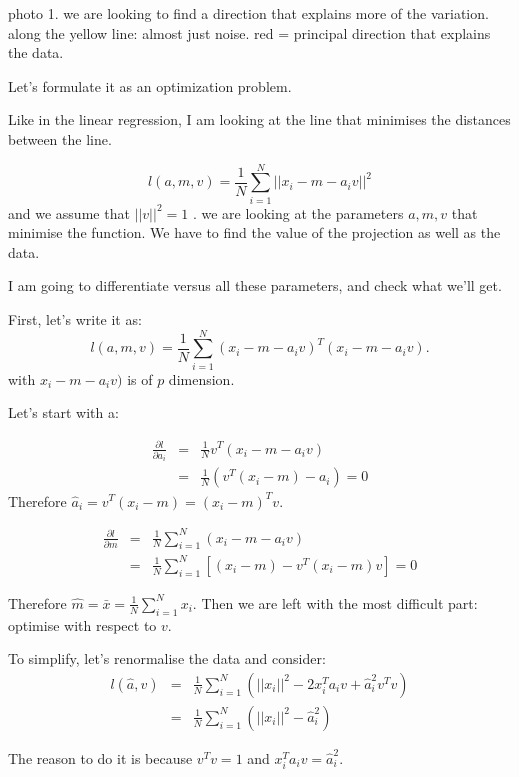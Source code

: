 \documentclass[a4paper]{tufte-book}
\newcommand{\nth}{\frac{1}{N}}
\newcommand{\sumin}{\sum_{i=1}^N}
\begin{document}
photo 1.
we are looking to find a direction that explains more of the variation.
along the yellow line: almost just noise.
red = principal direction that explains the data.

Let's formulate it as an optimization problem.

Like in the linear regression, I am looking at the line that minimises the
distances between the line.

\begin{equation}
    l(a,m,v) = \nth \sumin ||x_i - m - a_i v ||^2
\end{equation}
and we assume that $||v||^2 = 1$ .
we are looking at the parameters $a,m,v$ that minimise the function.
We have to find the value of the projection as well as the data.

I am going to differentiate versus all these parameters, and check what we'll
get.

First, let's write it as:
\begin{equation}
    l(a,m,v) = \nth \sumin (x_i - m - a_iv)^T(x_i - m - a_iv).
\end{equation}
with $x_i - m - a_i v)$ is of $p$ dimension.

Let's start with a:

\begin{eqnarray}
    \frac{\partial l}{\partial a_i} & = & \nth v^T (x_i - m - a_i v)\\
     & = & \nth (v^T (x_i - m) - a_i) = 0
 \end{eqnarray}
 Therefore $\hat a_i = v^T (x_i - m) = (x_i - m)^T v$.

\begin{eqnarray}
     \frac{\partial l}{\partial m} & = & \nth \sumin (x_i - m - a_i v)\\
     & = & \nth \sumin [(x_i - m) - v^T (x_i - m) v] = 0
\end{eqnarray}

Therefore $\hat m = \bar x = \nth \sumin x_i$. Then we are left with the most
difficult part: optimise with respect to $v$.

To simplify, let's renormalise the data and consider:
\begin{eqnarray}
    l(\hat a, v) & = & \nth \sumin (||x_i||^2 - 2 x_i^T a_i v + \hat a_i^2 v^T v)\\
     & = & \nth \sumin (||x_i||^2 - \hat a_i^2 )
\end{eqnarray}

The reason to do it is because $v^Tv = 1$ and $x_i^T a_i v = \hat a_i^2$.
\end{document}
